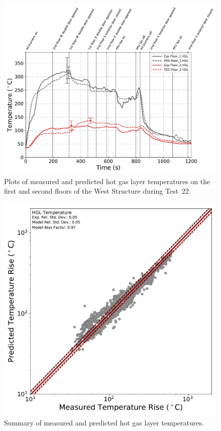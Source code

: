 \begin{figure}[!h]
	\centering
	\includegraphics[width=\columnwidth]{Figures/Plots/Validation/Temperature/Test_22_HGL}
	\caption[Plots of measured and predicted hot gas layer temperatures during Test~22.]{Plots of measured and predicted hot gas layer temperatures on the first and second floors of the West Structure during Test~22.}
	\label{fig:HGL_data}
\end{figure}

\begin{figure}[!h]
	\centering
	\includegraphics[width=\columnwidth]{Figures/Plots/Validation/Temperature/loglog_HGL}
	\caption{Summary of measured and predicted hot gas layer temperatures.}
	\label{fig:loglog_HGL}
\end{figure}

